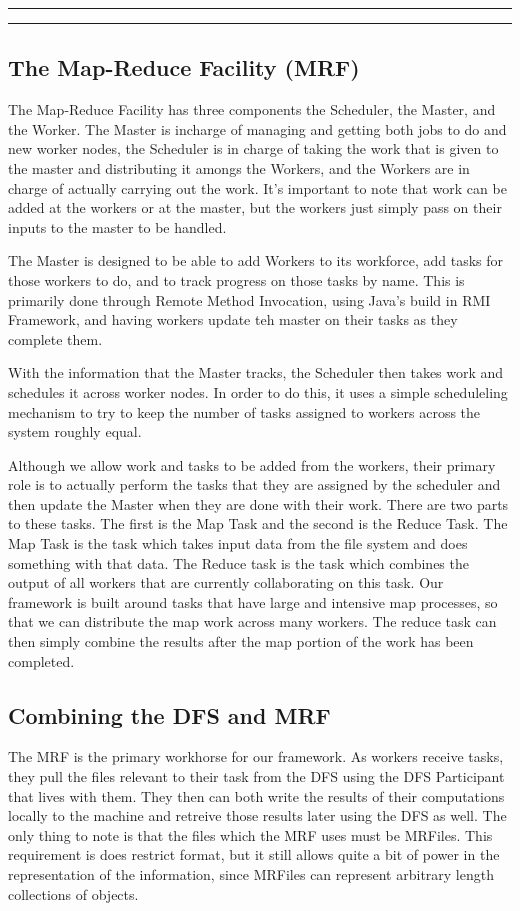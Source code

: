 \documentclass[11pt]{article}
\newcounter{questionCounter}
\newcounter{partCounter}[questionCounter]
\newenvironment{question}[2][\arabic{questionCounter}]{%
    \setcounter{partCounter}{0}%
    \vspace{.25in} \hrule \vspace{0.5em}%
        \noindent{\bf #2}%
    \vspace{0.8em} \hrule \vspace{.10in}%
    \addtocounter{questionCounter}{1}%
}{}
\begin{document}
\begin{question}{Section 1 - Design}
\subsection*{The Map-Reduce Facility (MRF)}
The Map-Reduce Facility has three components the Scheduler, the Master, and the Worker. The Master is incharge of managing and getting both jobs to do and new worker nodes, the Scheduler is in charge of taking the work that is given to the master and distributing it amongs the Workers, and the Workers are in charge of actually carrying out the work. It's important to note that work can be added at the workers or at the master, but the workers just simply pass on their inputs to the master to be handled.

The Master is designed to be able to add Workers to its workforce, add tasks for those workers to do, and to track progress on those tasks by name. This is primarily done through Remote Method Invocation, using Java's build in RMI Framework, and having workers update teh master on their tasks as they complete them.

With the information that the Master tracks, the Scheduler then takes work and schedules it across worker nodes. In order to do this, it uses a simple scheduleling mechanism to try to keep the number of tasks assigned to workers across the system roughly equal. 

Although we allow work and tasks to be added from the workers, their primary role is to actually perform the tasks that they are assigned by the scheduler and then update the Master when they are done with their work. There are two parts to these tasks. The first is the Map Task and the second is the Reduce Task. The Map Task is the task which takes input data from the file system and does something with that data. The Reduce task is the task which combines the output of all workers that are currently collaborating on this task. Our framework is built around tasks that have large and intensive map processes, so that we can distribute the map work across many workers. The reduce task can then simply combine the results after the map portion of the work has been completed.

\subsection*{Combining the DFS and MRF}
The MRF is the primary workhorse for our framework. As workers receive tasks, they pull the files relevant to their task from the DFS using the DFS Participant that lives with them. They then can both write the results of their computations locally to the machine and retreive those results later using the DFS as well. The only thing to note is that the files which the MRF uses must be MRFiles. This requirement is does restrict format, but it still allows quite a bit of power in the representation of the information, since MRFiles can represent arbitrary length collections of objects. 

\end{question}
\end{document}
